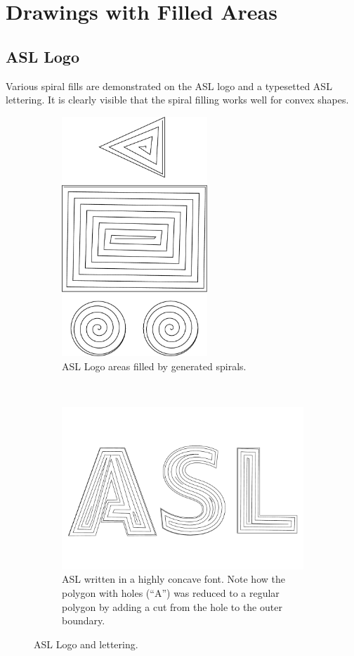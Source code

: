 \clearpage

\section{Drawings with Filled Areas}
\subsection{ASL Logo}

Various spiral fills are demonstrated on the ASL logo and a typesetted ASL lettering. It is clearly visible that the spiral filling works well for convex shapes.



\begin{figure}[h]
\centering
\begin{subfigure}[t]{0.95\textwidth}
\centering
	\includegraphics[height=9cm]{images/results/asl/asl_logo_spiral.pdf}
	\caption{ASL Logo areas filled by generated spirals.}
\end{subfigure}\\
\begin{subfigure}[t]{0.95\textwidth}
	\includegraphics[width=\textwidth]{images/results/asl/asl_font.pdf}
	\caption{ASL written in a highly concave font. Note how the polygon with holes (\enquote{A}) was reduced to a regular polygon by adding a cut from the hole to the outer boundary.}
\end{subfigure}
\caption{ASL Logo and lettering.}
\end{figure}

